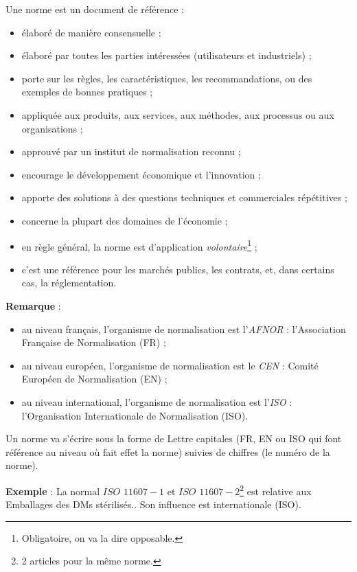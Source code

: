 \documentclass[a4paper,11pt]{article}
\newcounter{exe}
\newcommand{\exe}{\addtocounter{exe}{1}%
\noindent\textbf{Exemple \theexe } : }
\newcommand{\rem}{\noindent\textbf{Remarque} : }
\begin{document}
\begin{sloppypar}
Une  norme est un document de référence :
\begin{itemize}
 \item élaboré de manière consensuelle ;
 \item élaboré par toutes les parties intéressées (utilisateurs et industriels) ;
 \item porte sur les règles, les caractéristiques, les recommandations, ou des exemples de bonnes pratiques ;
 \item appliquée aux produits, aux services, aux méthodes, aux processus ou aux organisations ;
 \item approuvé par un institut de normalisation reconnu ;
 \item encourage le développement économique et l'innovation ;
 \item apporte des solutions à des questions techniques et commerciales répétitives ;
 \item concerne la plupart des domaines de l'économie ;
 \item en règle général, la norme est d'application \emph{volontaire}\footnote{Obligatoire, on va la dire \og opposable\fg.} ;
 \item c'est une référence pour les marchés publics, les contrats, et, dans certains cas, la réglementation.
\end{itemize}
\vspace{1.5ex}
\rem
\begin{itemize}
  \item au niveau français, l'organisme de normalisation est l'\emph{AFNOR} : l'Association Française de Normalisation (FR) ;
  \item au niveau européen, l'organisme de normalisation est le \emph{CEN} : Comité Européen de Normalisation (EN) ;
  \item au niveau international, l'organisme de normalisation est l'\emph{ISO} : l'Organisation Internationale de Normalisation (ISO).
\end{itemize}
\vspace{1.5ex}
Un norme va s'écrire sous la forme de Lettre capitales (FR, EN ou ISO qui font référence au niveau où fait effet la norme) suivies de chiffres (le numéro de la norme).\\

\exe La normal $ISO$ $11607-1$ et $ISO$ $11607-2$\footnote{2 articles pour la même norme.} est relative aux \og Emballages des DMs stérilisés.\fg. Son influence est internationale (ISO).\\


\end{sloppypar}
\end{document}
